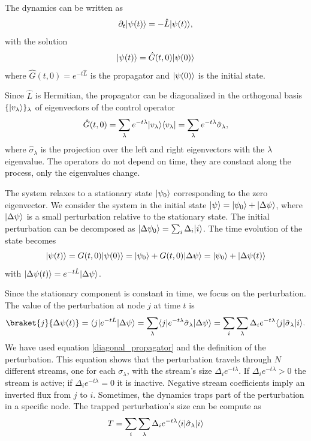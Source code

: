 The dynamics can be written as
\begin{equation} \label{time_evolution}
    \partial_t \lvert\psi(t)\rangle = - \hat L \lvert\psi(t)\rangle,
\end{equation}
with the solution
\begin{equation}
    \lvert\psi(t)\rangle = \hat G(t,0) \lvert\psi(0)\rangle
\end{equation}
where $\hat G(t,0) = e^{-t\hat L}$ is the propagator and $\lvert\psi(0)\rangle$ is the initial state. 

Since $\hat L$ is Hermitian, the propagator can be diagonalized in the orthogonal basis $\{\lvert v_\lambda\rangle\}_\lambda$ of eigenvectors of the control operator
\begin{equation}\label{diagonal_propagator}
    \hat G(t,0) = \sum_\lambda e^{-t\lambda} \lvert v_\lambda\rangle\langle v_\lambda\rvert = \sum_\lambda e^{-t\lambda} \hat \sigma_\lambda,
\end{equation}
where $\hat \sigma_\lambda$ is the projection over the left and right eigenvectors with the $\lambda$ eigenvalue. The operators do not depend on time, they are constant along the process, only the eigenvalues change.

The system relaxes to a stationary state $\lvert\psi_0\rangle$ corresponding to the zero eigenvector.
We consider the system in the initial state $\lvert\psi\rangle = \lvert\psi_0\rangle + \lvert\Delta\psi\rangle$, where $\lvert\Delta\psi\rangle$ is a small perturbation relative to the stationary state. The initial perturbation can be decomposed as $\lvert\Delta\psi_0\rangle = \sum_i \Delta_i \lvert i\rangle$.
The time evolution of the state becomes
\begin{equation}
    \lvert\psi(t)\rangle = G(t,0) \lvert\psi(0)\rangle = \lvert\psi_0\rangle + G(t,0)\lvert\Delta\psi\rangle = \lvert\psi_0\rangle + \lvert\Delta\psi(t)\rangle
\end{equation}
with $\lvert\Delta\psi(t)\rangle = e^{-t\hat L} \lvert\Delta \psi\rangle$.

Since the stationary component is constant in time, we focus on the perturbation. 
The value of the perturbation at node $j$ at time $t$ is
\begin{equation}
    \braket{j}{\Delta\psi(t)} = \bra{j} e^{-t\hat L} \ket{\Delta\psi} =\sum_\lambda \bra{j} e^{-t\lambda} \hat \sigma_\lambda\ket{\Delta\psi} = \sum_i  \sum_\lambda \Delta_i e^{-t\lambda} \bra{j}  \hat \sigma_\lambda \ket{i}.
\end{equation}
We have used equation \eqref{diagonal_propagator} and the definition of the perturbation.
This equation shows that the perturbation travels through $N$ different streams, one for each $\sigma_\lambda$, with the stream's size $\Delta_i e^{-t\lambda}$. If $\Delta_i e^{-t\lambda} > 0$ the stream is active; if $\Delta_i e^{-t\lambda} = 0$ it is inactive. Negative stream coefficients imply an inverted flux from $j$ to $i$.
Sometimes, the dynamics traps part of the perturbation in a specific node. The trapped perturbation's size can be compute as
\begin{equation}
    T = \sum_i  \sum_\lambda \Delta_i e^{-t\lambda} \langle i\rvert  \hat \sigma_\lambda \lvert i\rangle 
\end{equation} 

